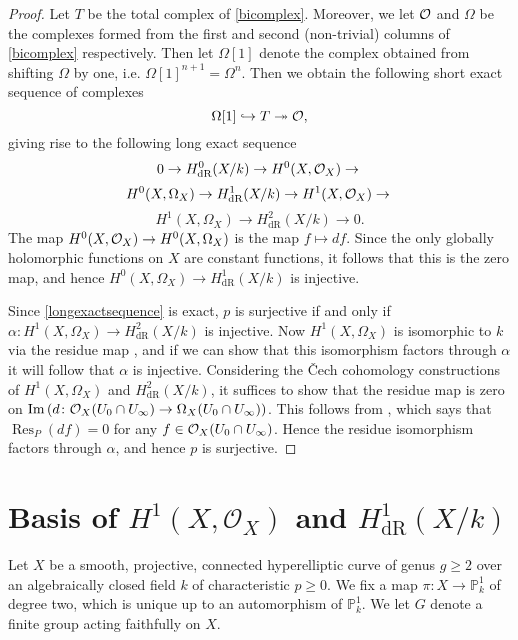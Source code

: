 \documentclass[draft, 11pt]{article} %
\theoremstyle{plain}
\theoremstyle{remark}
\newcommand{\cO}{{\cal O}}
\newcommand{\ra}{\rightarrow}
\newcommand{\cech}{\v{C}ech }
\newcommand{\hzero}{{H^0(X,\Omega_X)}}
\newcommand{\hone}{H^1(X,\mathcal{O}_X)}
\newcommand{\derhamhone}{H_{\text {dR}}^1(X/k)}
\DeclareMathOperator{\res}{Res}
\DeclareMathOperator{\Ima}{Im}
\begin{document}
\begin{proof}
Let $T$ be the total complex of \eqref{bicomplex}.
Moreover, we let $\cO$ and $\Omega$ be the complexes formed from the first and second (non-trivial) columns of \eqref{bicomplex} respectively.
Then let $\Omega[1]$ denote the complex obtained from shifting $\Omega$ by one, i.e. $\Omega[1]^{n+1} = \Omega^n$.
Then we obtain the following short exact sequence of complexes 
\[
\Omega[1] \hookrightarrow T \twoheadrightarrow \cO,
\]
giving rise to the following long exact sequence
\begin{equation*}
0 \ra H^0_{\text {dR}}(X/k) \ra H^0(X,\cO_X) \ra \\
\end{equation*}
\begin{equation}\label{longexactsequence}
 H^0(X,\Omega_X) \ra \derhamhone \ra \hone \ra \\
\end{equation}
\begin{equation*}
 H^1(X,\Omega_X) \ra H^2_{\text {dR}}(X/k) \ra 0.
\end{equation*}
The map $H^0(X,\cO_X) \ra \hzero$ is the map $f \mapsto df$.
Since the only globally holomorphic functions on $X$ are constant functions, it follows that this is the zero map, and hence $\hzero \ra \derhamhone$ is injective.

Since \eqref{longexactsequence} is exact, $p$ is surjective if and only if $\alpha \colon H^1(X,\Omega_X) \ra H^2_{\text {dR}}(X/k)$ is injective.
Now $H^1(X,\Omega_X)$ is isomorphic to $k$ via the residue map \cite[Chap. III, Thm. 7.14.1]{hart}, and if we can show that this isomorphism factors through $\alpha$ it will follow that $\alpha$ is injective.
Considering the \cech cohomology constructions of $H^1(X,\Omega_X)$ and $H^2_{\text {dR}}(X/k)$, it suffices to show that the residue map is zero on $\Ima \left( d \colon \cO_X(U_0 \cap U_\infty) \ra \Omega_X(U_0 \cap U_\infty) \right)$.
This follows from \cite[Chap. III, Thm. 7.14.1 (b)]{hart}, which says that $\res_P(df)=0$ for any $f \in \cO_X(U_0 \cap U_\infty)$.
Hence the residue isomorphism factors through $\alpha$, and hence $p$ is surjective.
\end{proof}

\section{Basis of $\hone$ and $\derhamhone$}

Let $X$ be a smooth, projective, connected hyperelliptic curve of genus $g \geq 2$ over an algebraically closed field $k$ of characteristic $p \geq 0$.
We  fix a map $\pi \colon X \rightarrow \mathbb P_k^1$ of degree two, which is unique up to an automorphism of $\mathbb P_k^1$.
We let $G$ denote a finite group acting faithfully on $X$.
\end{document}
